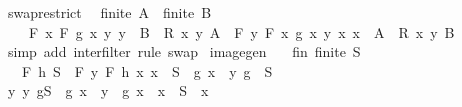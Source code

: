 \begin{isabellebody}
\endisatagproof
{\isafoldproof}%
%
\isadelimproof
\isanewline
%
\endisadelimproof
\isanewline
{}\isamarkupfalse%
\ swap{\isacharunderscore}{\kern0pt}restrict{\isacharcolon}{\kern0pt}\isanewline
\ \ {\isachardoublequoteopen}finite\ A\ {\isasymLongrightarrow}\ finite\ B\ {\isasymLongrightarrow}\isanewline
\ \ \ \ F\ {\isacharparenleft}{\kern0pt}{\isasymlambda}x{\isachardot}{\kern0pt}\ F\ {\isacharparenleft}{\kern0pt}g\ x{\isacharparenright}{\kern0pt}\ {\isacharbraceleft}{\kern0pt}y{\isachardot}{\kern0pt}\ y\ {\isasymin}\ B\ {\isasymand}\ R\ x\ y{\isacharbraceright}{\kern0pt}{\isacharparenright}{\kern0pt}\ A\ {\isacharequal}{\kern0pt}\ F\ {\isacharparenleft}{\kern0pt}{\isasymlambda}y{\isachardot}{\kern0pt}\ F\ {\isacharparenleft}{\kern0pt}{\isasymlambda}x{\isachardot}{\kern0pt}\ g\ x\ y{\isacharparenright}{\kern0pt}\ {\isacharbraceleft}{\kern0pt}x{\isachardot}{\kern0pt}\ x\ {\isasymin}\ A\ {\isasymand}\ R\ x\ y{\isacharbraceright}{\kern0pt}{\isacharparenright}{\kern0pt}\ B{\isachardoublequoteclose}\isanewline
%
\isadelimproof
\ \ %
\endisadelimproof
%
\isatagproof
{}\isamarkupfalse%
\ {\isacharparenleft}{\kern0pt}simp\ add{\isacharcolon}{\kern0pt}\ inter{\isacharunderscore}{\kern0pt}filter{\isacharparenright}{\kern0pt}\ {\isacharparenleft}{\kern0pt}rule\ swap{\isacharparenright}{\kern0pt}%
\endisatagproof
{\isafoldproof}%
%
\isadelimproof
\isanewline
%
\endisadelimproof
\isanewline
{}\isamarkupfalse%
\ image{\isacharunderscore}{\kern0pt}gen{\isacharcolon}{\kern0pt}\isanewline
\ \ \ fin{\isacharcolon}{\kern0pt}\ {\isachardoublequoteopen}finite\ S{\isachardoublequoteclose}\isanewline
\ \ \ {\isachardoublequoteopen}F\ h\ S\ {\isacharequal}{\kern0pt}\ F\ {\isacharparenleft}{\kern0pt}{\isasymlambda}y{\isachardot}{\kern0pt}\ F\ h\ {\isacharbraceleft}{\kern0pt}x{\isachardot}{\kern0pt}\ x\ {\isasymin}\ S\ {\isasymand}\ g\ x\ {\isacharequal}{\kern0pt}\ y{\isacharbraceright}{\kern0pt}{\isacharparenright}{\kern0pt}\ {\isacharparenleft}{\kern0pt}g\ {\isacharbackquote}{\kern0pt}\ S{\isacharparenright}{\kern0pt}{\isachardoublequoteclose}\isanewline
%
\isadelimproof
%
\endisadelimproof
%
\isatagproof
{}\isamarkupfalse%
\ {\isacharminus}{\kern0pt}\isanewline
\ \ \isamarkupfalse%
\ {\isachardoublequoteopen}{\isacharbraceleft}{\kern0pt}y{\isachardot}{\kern0pt}\ y{\isasymin}\ g{\isacharbackquote}{\kern0pt}S\ {\isasymand}\ g\ x\ {\isacharequal}{\kern0pt}\ y{\isacharbraceright}{\kern0pt}\ {\isacharequal}{\kern0pt}\ {\isacharbraceleft}{\kern0pt}g\ x{\isacharbraceright}{\kern0pt}{\isachardoublequoteclose}\ \ {\isachardoublequoteopen}x\ {\isasymin}\ S{\isachardoublequoteclose}\ \ x\isanewline

\end{isabellebody}
